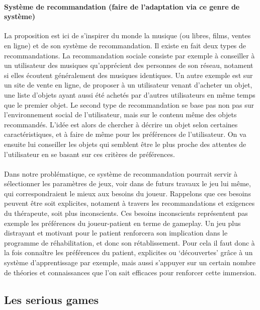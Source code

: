 			\paragraph{Système de recommandation (faire de l'adaptation via ce genre de système)}		
La proposition est ici de s'inspirer du monde la musique (ou libres, films, ventes en ligne) et de son système de recommandation. Il existe en fait deux types de recommandations. La recommandation sociale consiste par exemple à conseiller à un utilisateur des musiques qu'apprécient des personnes de son réseau, notament si elles écoutent généralement des musiques identiques. Un autre exemple est sur un site de vente en ligne, de proposer à un utilisateur venant d'acheter un objet, une liste d'objets ayant aussi été achetés par d'autres utilisateurs en même temps que le premier objet.
Le second type de recommandation se base pas non pas sur l'environnement social de l'utilisateur, mais sur le contenu même des objets recommandés. L'idée est alors de chercher à décrire un objet selon certaines caractéristiques, et à faire de même pour les préférences de l'utilisateur. On va ensuite lui conseiller les objets qui semblent être le plus proche des attentes de l'utilisateur en se basant sur ces critères de préférences. 
 \paragraph{}
 Dans notre problématique, ce système de recommandation pourrait servir à sélectionner les paramètres de jeux, voir dans de futurs travaux le jeu lui même, qui correspondraient le mieux aux besoins du joueur. Rappelons que ces besoins peuvent être soit explicites, notament à travers les recommandations et exigences du thérapeute, soit plus inconscients. Ces besoins inconscients représentent pas exemple les préférences du joueur-patient en terme de gameplay. Un jeu plus distrayant et motivant pour le patient renforcera son implication dans le programme de réhabilitation, et donc son rétablissement. Pour cela il faut donc à la fois connaître les préférences du patient, explicites ou `découvertes'  grâce à un système d'apprentissage par exemple, mais aussi s'appuyer sur un certain nombre de théories et connaissances que l'on sait efficaces pour renforcer cette immersion. 		
	\subsection{Les serious games}
	

